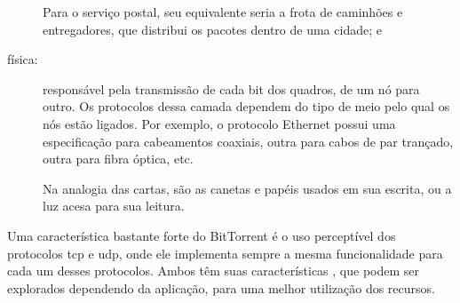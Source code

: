 \begin{description}
        Para o serviço postal, seu equivalente seria a frota de caminhões e
        entregadores, que distribui os pacotes dentro de uma cidade; e

    \item[física:] responsável pela transmissão de cada bit dos quadros, de um nó para
        outro. Os protocolos dessa camada dependem do tipo de meio pelo qual os nós
        estão ligados. Por exemplo, o protocolo Ethernet possui uma especificação para
        cabeamentos coaxiais, outra para cabos de par trançado, outra para fibra óptica,
        etc.

        Na analogia das cartas, são as canetas e papéis usados em sua escrita, ou a luz
        acesa para sua leitura.
\end{description}

Uma característica bastante forte do BitTorrent é o uso perceptível dos protocolos
\gls*{tcp} e \gls*{udp}, onde ele implementa sempre a mesma funcionalidade para cada um
desses protocolos. Ambos têm suas características , que podem ser explorados
dependendo da aplicação, para uma melhor utilização dos recursos.






